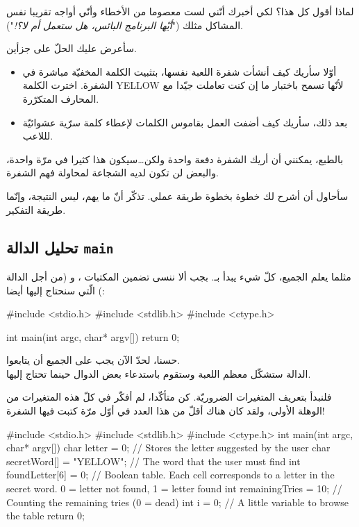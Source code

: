 لماذا أقول كل هذا؟ لكي أخبرك أنّني لست معصوما من الأخطاء وأنّي أواجه تقريبا نفس المشاكل مثلك
("\textit{أيّها البرنامج البائس، هل ستعمل أم لا؟!}").

سأعرض عليك الحلّ على جزأين.

\begin{itemize}
  \item أوّلا سأريك كيف أنشأت شفرة اللعبة نفسها، بتثبيت الكلمة المخفيّة مباشرة في الشفرة. اخترت الكلمة
\textenglish{YELLOW}
لأنّها تسمح باختبار ما إن كنت تعاملت جيّدا مع المحارف المتكرّرة.
  \item بعد ذلك، سأريك كيف أضفت العمل بقاموس الكلمات لإعطاء كلمة سرّية عشوائيّة لللاعب.
\end{itemize}

بالطبع، يمكنني أن أريك الشفرة دفعة واحدة ولكن\dots سيكون هذا كثيرا في مرّة واحدة، والبعض لن تكون لديه الشجاعة لمحاولة فهم الشفرة.

سأحاول أن أشرح لك خطوة بخطوة طريقة عملي. تذكّر أنّ ما يهم، ليس النتيجة، وإنّما طريقة التفكير.

\subsection{تحليل الدالة \texttt{main}}

مثلما يعلم الجميع، كلّ شيء يبدأ بـ.
بجب ألا ننسى تضمين المكتبات
،
و
(من أجل الدالة
)
الّتي سنحتاج إليها أيضا:

\begin{Csource}
#include <stdio.h>
#include <stdlib.h>
#include <ctype.h>

int main(int argc, char* argv[])
{
  return 0;
}
\end{Csource}

حسنا، لحدّ الآن يجب على الجميع أن يتابعوا.\\
الدالة
ستشكّل معظم اللعبة وستقوم باستدعاء بعض الدوال حينما تحتاج إليها.

فلنبدأ بتعريف المتغيرات الضروريّة. كن متأكّدا، لم أفكّر في كلّ هذه المتغيرات من الوهلة الأولى، ولقد كان هناك أقلّ من هذا العدد في أوّل مرّة كتبت فيها الشفرة!

\begin{Csource}
#include <stdio.h>
#include <stdlib.h>
#include <ctype.h>
int main(int argc, char* argv[])
{
  char letter = 0; // Stores the letter suggested by the user
  char secretWord[] = "YELLOW"; // The word that the user must find
  int foundLetter[6] = {0}; // Boolean table. Each cell corresponds to a letter in the secret word. 0 = letter not found, 1 = letter found
  int remainingTries = 10; // Counting the remaining tries (0 = dead)
  int i = 0; // A little variable to browse the table
  return 0;
}
\end{Csource}

